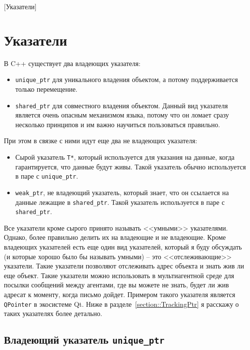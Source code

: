 [Указатели]


\section{Указатели}
\label{section::Ptrs}


В C++ существует два владеющих указателя:
\begin{itemize}
\item \texttt{unique\_ptr} для уникального владения объектом, а потому поддерживается только перемещение.

\item \texttt{shared\_ptr} для совместного владения объектом.
Данный вид указателя является очень опасным механизмом языка, потому что он ломает сразу несколько принципов и им важно научиться пользоваться правильно.
\end{itemize}
При этом в связке с ними идут еще два не владеющих указателя:
\begin{itemize}
\item Сырой указатель \texttt{T*}, который используется для указания на данные, когда гарантируется, что данные будут живы.
Такой указатель обычно используется в паре с \texttt{unique\_ptr}.

\item \texttt{weak\_ptr}, не владеющий указатель, который знает, что он ссылается на данные лежащие в \texttt{shared\_ptr}.
Такой указатель используется в паре с \texttt{shared\_ptr}.
\end{itemize}

Все указатели кроме сырого принято называть <<умными>> указателями.
Однако, более правильно делить их на владеющие и не владеющие.
Кроме владеющих указателей есть еще один вид указателей, который я буду обсуждать (и которые хорошо было бы называть умными) -- это <<отслеживающие>> указатели.
Такие указатели позволяют отслеживать адрес объекта и знать жив ли еще объект.
Такие указатели можно использовать в мультиагентной среде для посылки сообщений между агентами, где вы можете не знать, будет ли жив адресат к моменту, когда письмо дойдет.
Примером такого указателя является \texttt{QPointer} в экосистеме Qt.
Ниже в разделе~\ref{section::TrackingPtr} я расскажу о таких указателях более детально.

\subsection{Владеющий указатель \texttt{unique\_ptr}}
\label{section::UniquePtr}

